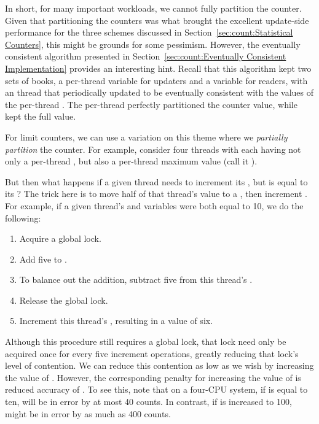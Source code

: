 In short, for many important workloads, we cannot fully partition the counter.
Given that partitioning the counters was what brought the excellent
update-side performance for the three schemes discussed in
Section~\ref{sec:count:Statistical Counters}, this might be grounds
for some pessimism.
However, the eventually consistent algorithm presented in
Section~\ref{sec:count:Eventually Consistent Implementation}
provides an interesting hint.
Recall that this algorithm kept two sets of books, a
per-thread  variable for updaters and a 
variable for readers, with an  thread that periodically
updated  to be eventually consistent with the values
of the per-thread .
The per-thread  perfectly partitioned the counter value, while
 kept the full value.

For limit counters, we can use a variation on this theme where we
\emph{partially partition} the counter.
For example, consider four threads with each having not only a
per-thread , but also a per-thread maximum value (call
it ).

But then what happens if a given thread needs to increment its
, but  is equal to its ?
The trick here is to move half of that thread's  value
to a , then increment .
For example, if a given thread's  and 
variables were both equal to 10, we do the following:

\begin{enumerate}
\item	Acquire a global lock.
\item	Add five to .
\item	To balance out the addition, subtract five from this
	thread's .
\item	Release the global lock.
\item	Increment this thread's , resulting in a value of six.
\end{enumerate}

Although this procedure still requires a global lock, that lock need only be
acquired once for every five increment operations, greatly reducing
that lock's level of contention.
We can reduce this contention as low as we wish by increasing the
value of .
However, the corresponding penalty for increasing the value of
 is reduced accuracy of .
To see this, note that on a four-CPU system, if 
is equal to ten,  will be in error by at most
40 counts.
In contrast, if  is increased to 100, 
might be in error by as much as 400 counts.

